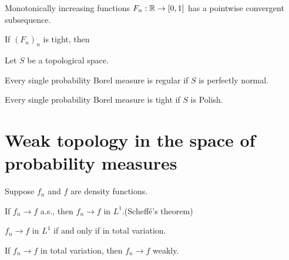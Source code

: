 \documentclass{../note}
\begin{document}
\begin{prb}
\end{prb}

\begin{prb}
\end{prb}

\begin{prb}
\end{prb}

\begin{prb}
\begin{parts}
\item Monotonically increasing functions $F_n:\mathbb{R}\to[0,1]$ has a pointwise convergent subsequence.
\item If $(F_n)_n$ is tight, then
\end{parts}
\end{prb}






\begin{prb}
Let $S$ be a topological space.
\begin{parts}
\item Every single probability Borel measure is regular if $S$ is perfectly normal.
\item Every single probability Borel measure is tight if $S$ is Polish.
\end{parts}
\end{prb}





\section{Weak topology in the space of probability measures}


\begin{prb}
Suppose $f_n$ and $f$ are density functions.
\begin{parts}
\item If $f_n\to f$ a.s., then $f_n\to f$ in $L^1$.\hfill(Scheff\'e's theorem)
\item $f_n\to f$ in $L^1$ if and only if in total variation.
\item If $f_n\to f$ in total variation, then $f_n\to f$ weakly.
\end{parts}
\end{prb}
\end{document}
